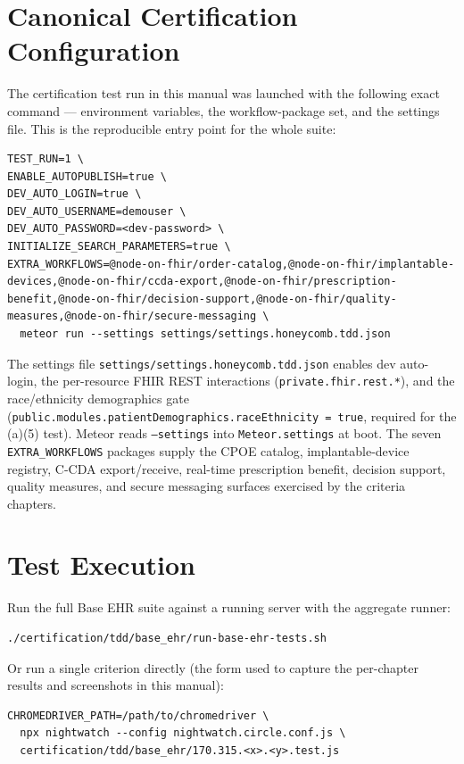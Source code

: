 \section{Canonical Certification Configuration}
\label{sec:cert-config}

The certification test run in this manual was launched with the following exact
command --- environment variables, the workflow-package set, and the settings
file. This is the reproducible entry point for the whole suite:

\begin{lstlisting}
TEST_RUN=1 \
ENABLE_AUTOPUBLISH=true \
DEV_AUTO_LOGIN=true \
DEV_AUTO_USERNAME=demouser \
DEV_AUTO_PASSWORD=<dev-password> \
INITIALIZE_SEARCH_PARAMETERS=true \
EXTRA_WORKFLOWS=@node-on-fhir/order-catalog,@node-on-fhir/implantable-devices,@node-on-fhir/ccda-export,@node-on-fhir/prescription-benefit,@node-on-fhir/decision-support,@node-on-fhir/quality-measures,@node-on-fhir/secure-messaging \
  meteor run --settings settings/settings.honeycomb.tdd.json
\end{lstlisting}

The settings file \texttt{settings/settings.honeycomb.tdd.json} enables dev
auto-login, the per-resource FHIR REST interactions
(\texttt{private.fhir.rest.*}), and the race/ethnicity demographics gate
(\texttt{public.modules.patientDemographics.raceEthnicity = true}, required for
the (a)(5) test). Meteor reads \texttt{--settings} into \texttt{Meteor.settings}
at boot. The seven \texttt{EXTRA\_WORKFLOWS} packages supply the CPOE catalog,
implantable-device registry, C-CDA export/receive, real-time prescription
benefit, decision support, quality measures, and secure messaging surfaces
exercised by the criteria chapters.

\section{Test Execution}

Run the full Base EHR suite against a running server with the aggregate runner:

\begin{lstlisting}
./certification/tdd/base_ehr/run-base-ehr-tests.sh
\end{lstlisting}

Or run a single criterion directly (the form used to capture the per-chapter
results and screenshots in this manual):

\begin{lstlisting}
CHROMEDRIVER_PATH=/path/to/chromedriver \
  npx nightwatch --config nightwatch.circle.conf.js \
  certification/tdd/base_ehr/170.315.<x>.<y>.test.js
\end{lstlisting}

